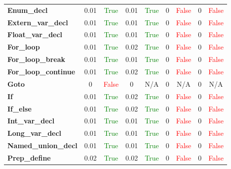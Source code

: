 \documentclass{article}
\begin{document}
\begin{xltabular}{\textwidth}{lcccccccc}
\textbf{{\fontsize{10}{12}\selectfont Enum\_decl}}& 0.01&\textcolor{green}{True}& 0.01&\textcolor{green}{True}& 0&\textcolor{red}{False}& 0&\textcolor{red}{False} \\[0.5ex]
\textbf{{\fontsize{10}{12}\selectfont Extern\_var\_decl}}& 0.01&\textcolor{green}{True}& 0.01&\textcolor{green}{True}& 0&\textcolor{red}{False}& 0&\textcolor{red}{False} \\[0.5ex]
\textbf{{\fontsize{10}{12}\selectfont Float\_var\_decl}}& 0.01&\textcolor{green}{True}& 0.01&\textcolor{green}{True}& 0&\textcolor{red}{False}& 0&\textcolor{red}{False} \\[0.5ex]
\textbf{{\fontsize{10}{12}\selectfont For\_loop}}& 0.01&\textcolor{green}{True}& 0.02&\textcolor{green}{True}& 0&\textcolor{red}{False}& 0&\textcolor{red}{False} \\[0.5ex]
\textbf{{\fontsize{10}{12}\selectfont For\_loop\_break}}& 0.01&\textcolor{green}{True}& 0.01&\textcolor{green}{True}& 0&\textcolor{red}{False}& 0&\textcolor{red}{False} \\[0.5ex]
\textbf{{\fontsize{10}{12}\selectfont For\_loop\_continue}}& 0.01&\textcolor{green}{True}& 0.02&\textcolor{green}{True}& 0&\textcolor{red}{False}& 0&\textcolor{red}{False} \\[0.5ex]
\textbf{{\fontsize{10}{12}\selectfont Goto}}& 0&\textcolor{red}{False}& 0&N/A& 0&N/A& 0&N/A \\[0.5ex]
\textbf{{\fontsize{10}{12}\selectfont If}}& 0.01&\textcolor{green}{True}& 0.02&\textcolor{green}{True}& 0&\textcolor{red}{False}& 0&\textcolor{red}{False} \\[0.5ex]
\textbf{{\fontsize{10}{12}\selectfont If\_else}}& 0.01&\textcolor{green}{True}& 0.02&\textcolor{green}{True}& 0&\textcolor{red}{False}& 0&\textcolor{red}{False} \\[0.5ex]
\textbf{{\fontsize{10}{12}\selectfont Int\_var\_decl}}& 0.01&\textcolor{green}{True}& 0.01&\textcolor{green}{True}& 0&\textcolor{red}{False}& 0&\textcolor{red}{False} \\[0.5ex]
\textbf{{\fontsize{10}{12}\selectfont Long\_var\_decl}}& 0.01&\textcolor{green}{True}& 0.01&\textcolor{green}{True}& 0&\textcolor{red}{False}& 0&\textcolor{red}{False} \\[0.5ex]
\textbf{{\fontsize{10}{12}\selectfont Named\_union\_decl}}& 0.01&\textcolor{green}{True}& 0.01&\textcolor{green}{True}& 0&\textcolor{red}{False}& 0&\textcolor{red}{False} \\[0.5ex]
\textbf{{\fontsize{10}{12}\selectfont Prep\_define}}& 0.02&\textcolor{green}{True}& 0.02&\textcolor{green}{True}& 0&\textcolor{red}{False}& 0&\textcolor{red}{False} \\[0.5ex]

\end{xltabular}
\end{document}
